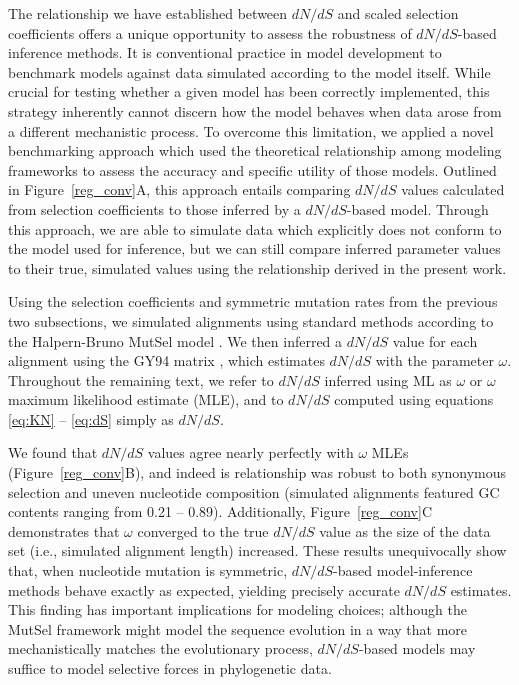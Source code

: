 \documentclass[11pt]{article}
\begin{document}
The relationship we have established between $dN/dS$ and scaled selection coefficients offers a unique opportunity to assess the robustness of $dN/dS$-based inference methods. It is conventional practice in model development to benchmark models against data simulated according to the model itself. While crucial for testing whether a given model has been correctly implemented, this strategy inherently cannot discern how the model behaves when data arose from a different mechanistic process. To overcome this limitation, we applied a novel benchmarking approach which used the theoretical relationship among modeling frameworks to assess the accuracy and specific utility of those models. Outlined in Figure~\ref{reg_conv}A, this approach entails comparing $dN/dS$ values calculated from selection coefficients to those inferred by a $dN/dS$-based model. Through this approach, we are able to simulate data which explicitly does not conform to the model used for inference, but we can still compare inferred parameter values to their true, simulated values using the relationship derived in the present work.

Using the selection coefficients and symmetric mutation rates from the previous two subsections, we simulated alignments using standard methods \citep{Yang2006} according to the Halpern-Bruno MutSel model \citep{HalpernBruno1998}. We then inferred a $dN/dS$ value for each alignment using the GY94 matrix \citep{GoldmanYang1994,NielsenYang1998}, which estimates $dN/dS$ with the parameter $\omega$. Throughout the remaining text, we refer to $dN/dS$ inferred using ML as $\omega$ or $\omega$ maximum likelihood estimate (MLE), and to $dN/dS$ computed using equations \eqref{eq:KN} -- \eqref{eq:dS} simply as $dN/dS$. 

We found that $dN/dS$ values agree nearly perfectly with $\omega$ MLEs (Figure~\ref{reg_conv}B), and indeed is relationship was robust to both synonymous selection and uneven nucleotide composition (simulated alignments featured GC contents ranging from 0.21 -- 0.89). Additionally, Figure~\ref{reg_conv}C demonstrates that $\omega$ converged to the true $dN/dS$ value as the size of the data set (i.e., simulated alignment length) increased. These results unequivocally show that, when nucleotide mutation is symmetric,  $dN/dS$-based model-inference methods behave exactly as expected, yielding precisely accurate $dN/dS$ estimates. This finding has important implications for modeling choices; although the MutSel framework might model the sequence evolution in a way that more mechanistically matches the evolutionary process, $dN/dS$-based models may suffice to model selective forces in phylogenetic data.
\end{document}
